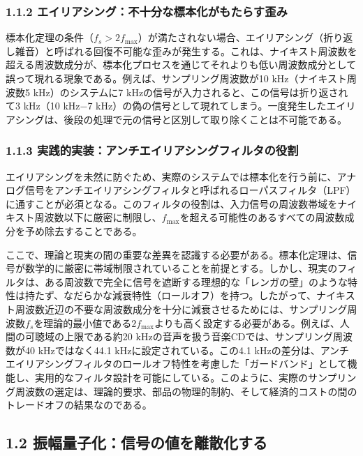 \documentclass[
  a4paper,  %
  11pt,     %
]{ltjsarticle}%
\begin{document}
\subsubsection{1.1.2 エイリアシング：不十分な標本化がもたらす歪み}

標本化定理の条件（$f_s > 2f_{\text{max}}$）が満たされない場合、エイリアシング（折り返し雑音）と呼ばれる回復不可能な歪みが発生する\cite{ref8}。これは、ナイキスト周波数を超える周波数成分が、標本化プロセスを通じてそれよりも低い周波数成分として誤って現れる現象である。例えば、サンプリング周波数が10 kHz（ナイキスト周波数5 kHz）のシステムに7 kHzの信号が入力されると、この信号は折り返されて3 kHz（10 kHz−7 kHz）の偽の信号として現れてしまう。一度発生したエイリアシングは、後段の処理で元の信号と区別して取り除くことは不可能である。

\subsubsection{1.1.3 実践的実装：アンチエイリアシングフィルタの役割}

エイリアシングを未然に防ぐため、実際のシステムでは標本化を行う前に、アナログ信号をアンチエイリアシングフィルタと呼ばれるローパスフィルタ（LPF）に通すことが必須となる。このフィルタの役割は、入力信号の周波数帯域をナイキスト周波数以下に厳密に制限し、$f_{\text{max}}$を超える可能性のあるすべての周波数成分を予め除去することである。

ここで、理論と現実の間の重要な差異を認識する必要がある。標本化定理は、信号が数学的に厳密に帯域制限されていることを前提とする。しかし、現実のフィルタは、ある周波数で完全に信号を遮断する理想的な「レンガの壁」のような特性は持たず、なだらかな減衰特性（ロールオフ）を持つ。したがって、ナイキスト周波数近辺の不要な周波数成分を十分に減衰させるためには、サンプリング周波数$f_s$を理論的最小値である$2f_{\text{max}}$よりも高く設定する必要がある。例えば、人間の可聴域の上限である約20 kHzの音声を扱う音楽CDでは、サンプリング周波数が40 kHzではなく44.1 kHzに設定されている\cite{ref9}。この4.1 kHzの差分は、アンチエイリアシングフィルタのロールオフ特性を考慮した「ガードバンド」として機能し、実用的なフィルタ設計を可能にしている。このように、実際のサンプリング周波数の選定は、理論的要求、部品の物理的制約、そして経済的コストの間のトレードオフの結果なのである。

\subsection{1.2 振幅量子化：信号の値を離散化する}
\end{document}
